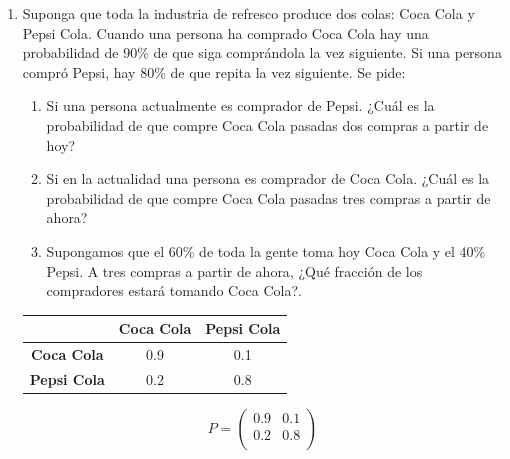 \documentclass{templateNote}
\begin{document}
\begin{enumerate}
    
    \newpage
    \item Suponga que toda la industria de refresco produce dos colas: Coca Cola y Pepsi Cola. Cuando una persona ha comprado Coca Cola hay una probabilidad de 90\% de que siga comprándola la vez siguiente. Si una persona compró Pepsi, hay 80\% de que repita la vez siguiente. Se pide:
    \begin{enumerate}[label=\alph*)]
        \item  Si una persona actualmente es comprador de Pepsi. ¿Cuál es la probabilidad de que compre Coca Cola pasadas dos compras a partir de hoy?
        \item Si en la actualidad una persona es comprador de Coca Cola. ¿Cuál es la probabilidad de que compre Coca Cola pasadas tres compras a partir de ahora?
        \item Supongamos que el 60\% de toda la gente toma hoy Coca Cola y el 40\% Pepsi. A tres compras a partir de ahora, ¿Qué fracción de los compradores estará tomando Coca Cola?.
    \end{enumerate}

    \begin{table}[H]
        \centering
        \begin{tabular}{|c|c|c|}
            \hline
            & \textbf{Coca Cola} & \textbf{Pepsi Cola} \\ \hline
            \textbf{Coca Cola} & 0.9 & 0.1 \\
            \textbf{Pepsi Cola} & 0.2 & 0.8 \\ \hline
        \end{tabular}
    \end{table}

    \begin{equation*}
        P = 
        \begin{pmatrix}
            0.9 & 0.1\\
            0.2 & 0.8\\
        \end{pmatrix}
    \end{equation*}


\end{enumerate}
\end{document}
